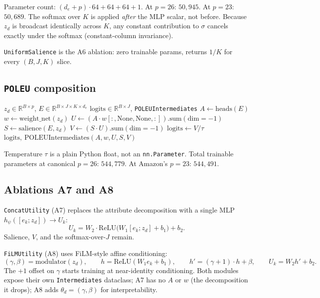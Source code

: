 \documentclass[11pt,a4paper]{article}
\begin{document}
Parameter count: $(d_e + p)\cdot 64 + 64 + 64 + 1$. At $p = 26$:
$50{,}945$. At $p = 23$: $50{,}689$. The softmax over $K$ is applied
\emph{after} the MLP scalar, not before. Because $z_d$ is broadcast
identically across $K$, any constant contribution to $\sigma$ cancels
exactly under the softmax (constant-column invariance).

\texttt{UniformSalience} is the A6 ablation: zero trainable params,
returns $1/K$ for every $(B, J, K)$ slice.

\subsection{\texttt{POLEU} composition}

\begin{algorithm}[H]
\caption{\texttt{POLEU.forward}}
\begin{algorithmic}[1]
\Require $z_d \in \mathbb{R}^{B \times p}$, $E \in \mathbb{R}^{B \times J \times K \times d_e}$
\Ensure $\text{logits} \in \mathbb{R}^{B \times J}$, \texttt{POLEUIntermediates}
\State $A \gets \text{heads}(E)$ 
\State $w \gets \text{weight\_net}(z_d)$ 
\State $U \gets (A \cdot w[:, \text{None}, \text{None}, :]).\mathrm{sum}(\mathrm{dim}=-1)$ 
\State $S \gets \text{salience}(E, z_d)$ 
\State $V \gets (S \cdot U).\mathrm{sum}(\mathrm{dim}=-1)$ 
\State $\text{logits} \gets V / \tau$
\State \Return $\text{logits},\ \text{POLEUIntermediates}(A, w, U, S, V)$
\end{algorithmic}
\end{algorithm}

Temperature $\tau$ is a plain Python float, not an
\texttt{nn.Parameter}. Total trainable parameters at canonical $p = 26$:
$544{,}779$. At Amazon's $p = 23$: $544{,}491$.

\subsection{Ablations A7 and A8}

\texttt{ConcatUtility} (A7) replaces the attribute decomposition with
a single MLP $h_\psi([e_k; z_d]) \to U_k$:
\[
U_k = W_2 \cdot \mathrm{ReLU}\bigl(W_1 [e_k; z_d] + b_1\bigr) + b_2.
\]
Salience, $V$, and the softmax-over-$J$ remain.

\texttt{FiLMUtility} (A8) uses FiLM-style affine conditioning:
\[
(\gamma, \beta) = \mathrm{modulator}(z_d), \qquad
h = \mathrm{ReLU}(W_1 e_k + b_1), \qquad
h' = (\gamma + 1) \cdot h + \beta, \qquad
U_k = W_2 h' + b_2.
\]
The $+1$ offset on $\gamma$ starts training at near-identity
conditioning. Both modules expose their own
\texttt{Intermediates} dataclass; A7 has no $A$ or $w$ (the
decomposition it drops); A8 adds $\theta_d = (\gamma, \beta)$ for
interpretability.
\end{document}
